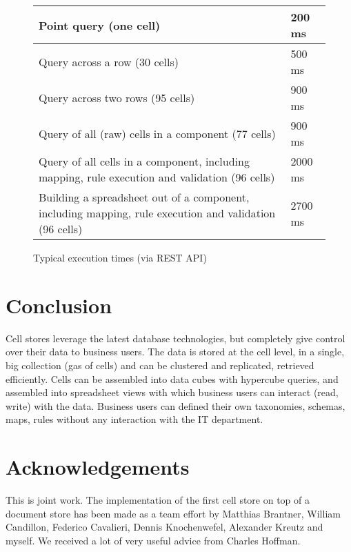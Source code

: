 \documentclass{vldb}
\begin{document}
\begin{figure*}
\caption{Typical execution times (via REST API)}
\label{fig-measurements}
\begin{tabular}{|l|l|}
\hline
Point query (one cell) & 200 ms \\
\hline
Query across a row (30 cells)& 500 ms \\
\hline
Query across two rows (95 cells)& 900 ms \\
\hline
Query of all (raw) cells in a component (77 cells) & 900 ms \\
\hline
Query of all cells in a component, including mapping, rule execution and validation (96 cells) & 2000 ms \\
\hline
Building a spreadsheet out of a component, including mapping, rule execution and validation (96 cells) & 2700 ms \\
\hline
\end{tabular}
\end{figure*}

\section{Conclusion}

Cell stores leverage the latest database technologies, but completely give control over their data to business users. The data is stored at the cell level, in a single, big collection (gas of cells) and can be clustered and replicated, retrieved efficiently. Cells can be assembled into data cubes with hypercube queries, and assembled into spreadsheet views with which business users can interact (read, write) with the data. Business users can defined their own taxonomies, schemas, maps, rules without any interaction with the IT department.

\section{Acknowledgements}

This is joint work. The implementation of the first cell store on top of a document store has been made as a team effort by Matthias Brantner, William Candillon, Federico Cavalieri, Dennis Knochenwefel, Alexander Kreutz and myself. We received a lot of very useful advice from Charles Hoffman.


\end{document}
